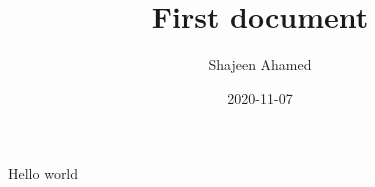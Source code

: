 \documentclass{article}
\title{First document}
\date{2020-11-07}
\author{Shajeen Ahamed}
\begin{document}
				\maketitle
				\newpage

				Hello world
\end{document}
